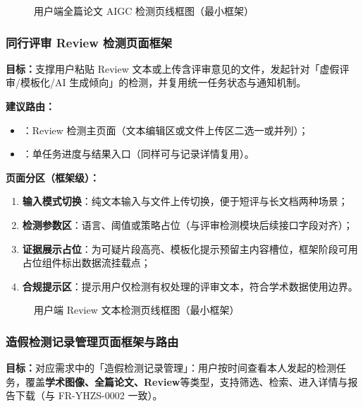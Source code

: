 \begin{figure}[H]
    \centering
    \resizebox{0.98\textwidth}{!}{}
    \caption{用户端全篇论文 AIGC 检测页线框图（最小框架）}
\end{figure}

\subsubsection{同行评审 Review 检测页面框架}
\textbf{目标：}支撑用户粘贴 Review 文本或上传含评审意见的文件，发起针对「虚假评审/模板化/AI 生成倾向」的检测，并复用统一任务状态与通知机制。

\textbf{建议路由：}
\begin{itemize}[leftmargin=2em]
    \item {}：Review 检测主页面（文本编辑区或文件上传区二选一或并列）；
    \item {}：单任务进度与结果入口（同样可与记录详情复用）。
\end{itemize}

\textbf{页面分区（框架级）：}
\begin{enumerate}[leftmargin=2em]
    \item \textbf{输入模式切换}：纯文本输入与文件上传切换，便于短评与长文档两种场景；
    \item \textbf{检测参数区}：语言、阈值或策略占位（与评审检测模块后续接口字段对齐）；
    \item \textbf{证据展示占位}：为可疑片段高亮、模板化提示预留主内容槽位，框架阶段可用占位组件标出数据流挂载点；
    \item \textbf{合规提示区}：提示用户仅检测有权处理的评审文本，符合学术数据使用边界。
\end{enumerate}

\begin{figure}[H]
    \centering
    \resizebox{0.98\textwidth}{!}{}
    \caption{用户端 Review 文本检测页线框图（最小框架）}
\end{figure}

\subsubsection{造假检测记录管理页面框架与路由}
\textbf{目标：}对应需求中的「造假检测记录管理」：用户按时间查看本人发起的检测任务，覆盖\textbf{学术图像、全篇论文、Review}等类型，支持筛选、检索、进入详情与报告下载（与 FR-YHZS-0002 一致）。

